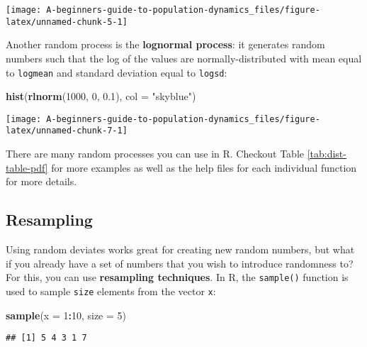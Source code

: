 \documentclass[]{book}
\newenvironment{Shaded}{\begin{snugshade}}{\end{snugshade}}
\newcommand{\DataTypeTok}[1]{\textcolor[rgb]{0.13,0.29,0.53}{#1}}
\newcommand{\DecValTok}[1]{\textcolor[rgb]{0.00,0.00,0.81}{#1}}
\newcommand{\FloatTok}[1]{\textcolor[rgb]{0.00,0.00,0.81}{#1}}
\newcommand{\KeywordTok}[1]{\textcolor[rgb]{0.13,0.29,0.53}{\textbf{#1}}}
\newcommand{\NormalTok}[1]{#1}
\newcommand{\OperatorTok}[1]{\textcolor[rgb]{0.81,0.36,0.00}{\textbf{#1}}}
\newcommand{\StringTok}[1]{\textcolor[rgb]{0.31,0.60,0.02}{#1}}
\begin{document}
\begin{center}\texttt{[image: A-beginners-guide-to-population-dynamics\_files/figure-latex/unnamed-chunk-5-1]} \end{center}

Another random process is the \textbf{lognormal process}: it generates random numbers such that the log of the values are normally-distributed with mean equal to \texttt{logmean} and standard deviation equal to \texttt{logsd}:

\begin{Shaded}
\begin{Highlighting}[]
\KeywordTok{hist}\NormalTok{(}\KeywordTok{rlnorm}\NormalTok{(}\DecValTok{1000}\NormalTok{, }\DecValTok{0}\NormalTok{, }\FloatTok{0.1}\NormalTok{), }\DataTypeTok{col =} \StringTok{"skyblue"}\NormalTok{)}
\end{Highlighting}
\end{Shaded}

\begin{center}\texttt{[image: A-beginners-guide-to-population-dynamics\_files/figure-latex/unnamed-chunk-7-1]} \end{center}

There are many random processes you can use in R. Checkout Table \ref{tab:dist-table-pdf} for more examples as well as the help files for each individual function for more details.

\hypertarget{resampling}{%
\subsection{Resampling}\label{resampling}}

Using random deviates works great for creating new random numbers, but what if you already have a set of numbers that you wish to introduce randomness to? For this, you can use \textbf{resampling techniques}. In R, the \texttt{sample()} function is used to sample \texttt{size} elements from the vector \texttt{x}:

\begin{Shaded}
\begin{Highlighting}[]
\KeywordTok{sample}\NormalTok{(}\DataTypeTok{x =} \DecValTok{1}\OperatorTok{:}\DecValTok{10}\NormalTok{, }\DataTypeTok{size =} \DecValTok{5}\NormalTok{)}
\end{Highlighting}
\end{Shaded}

\begin{verbatim}
## [1] 5 4 3 1 7
\end{verbatim}
\end{document}
